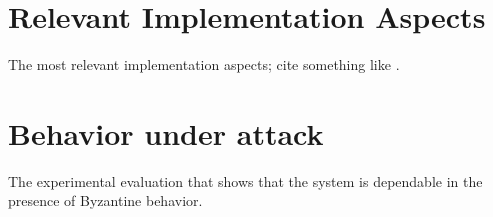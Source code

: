 \section{Relevant Implementation Aspects}

The most relevant implementation aspects; cite something like \cite{ibft-paper}.

\section{Behavior under attack}

The experimental evaluation that shows that the system is dependable in the
presence of Byzantine behavior.






